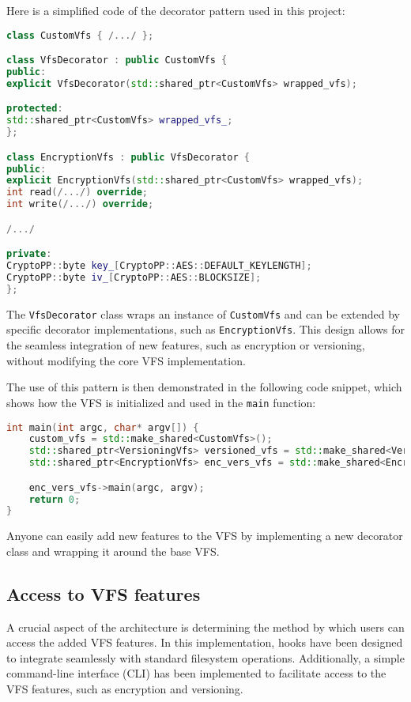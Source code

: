 Here is a simplified code of the decorator pattern used in this project:

\begin{lstlisting}[language=c++, basicstyle=\ttfamily\small]
class CustomVfs { /.../ };

class VfsDecorator : public CustomVfs {
public:
explicit VfsDecorator(std::shared_ptr<CustomVfs> wrapped_vfs);

protected:
std::shared_ptr<CustomVfs> wrapped_vfs_;
};

class EncryptionVfs : public VfsDecorator {
public:
explicit EncryptionVfs(std::shared_ptr<CustomVfs> wrapped_vfs);
int read(/.../) override;
int write(/.../) override;

/.../

private:
CryptoPP::byte key_[CryptoPP::AES::DEFAULT_KEYLENGTH];
CryptoPP::byte iv_[CryptoPP::AES::BLOCKSIZE];
};
\end{lstlisting}

The \texttt{VfsDecorator} class wraps an instance of \texttt{CustomVfs} and can be extended by specific decorator implementations, such as \texttt{EncryptionVfs}.
This design allows for the seamless integration of new features, such as encryption or versioning, without modifying the core VFS implementation.

The use of this pattern is then demonstrated in the following code snippet, which shows how the VFS is initialized and used in the \texttt{main} function:

\begin{lstlisting}[language=c++, basicstyle=\ttfamily\small]
int main(int argc, char* argv[]) {
    custom_vfs = std::make_shared<CustomVfs>();
    std::shared_ptr<VersioningVfs> versioned_vfs = std::make_shared<VersioningVfs>(custom_vfs);
    std::shared_ptr<EncryptionVfs> enc_vers_vfs = std::make_shared<EncryptionVfs>(versioned_vfs);

    enc_vers_vfs->main(argc, argv);
    return 0;
}
\end{lstlisting}

Anyone can easily add new features to the VFS by implementing a new decorator class and wrapping it around the base VFS.

\subsection{Access to VFS features}\label{subsec:access-to-vfs-features}

A crucial aspect of the architecture is determining the method by which users can access the added VFS features.
In this implementation, hooks have been designed to integrate seamlessly with standard filesystem operations.
Additionally, a simple command-line interface (CLI) has been implemented to facilitate access to the VFS features, such as encryption and versioning.

